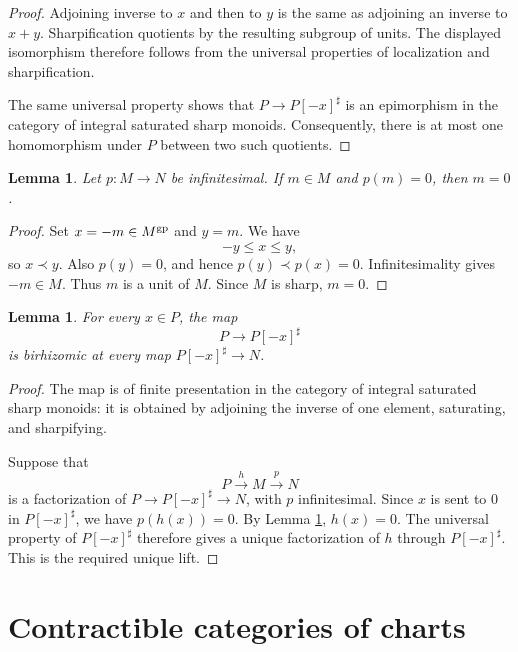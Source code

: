 \documentclass{article}
\newtheorem{lemma}[theorem]{Lemma}
\theoremstyle{definition}
\theoremstyle{remark}
\begin{document}
\begin{proof}
Adjoining inverse to \(x\) and then to \(y\) is the same as adjoining an inverse to \(x+y\).  Sharpification quotients by the resulting subgroup of units.  The displayed isomorphism therefore follows from the universal properties of localization and sharpification.

The same universal property shows that \(P\to P[-x]^\sharp\) is an epimorphism in the category of integral saturated sharp monoids.  Consequently, there is at most one homomorphism under \(P\) between two such quotients.
\end{proof}

\begin{lemma}\label{lem:zero-fibre}
Let \(p:M\to N\) be infinitesimal.  If \(m\in M\) and \(p(m)=0\), then \(m=0\).
\end{lemma}

\begin{proof}
Set \(x=-m\in M^{\rm gp}\) and \(y=m\).  We have
\[
-y\le x\le y,
\]
so \(x\prec y\).  Also \(p(y)=0\), and hence \(p(y)\prec p(x)=0\).  Infinitesimality gives \(-m\in M\).  Thus \(m\) is a unit of \(M\).  Since \(M\) is sharp, \(m=0\).
\end{proof}

\begin{lemma}\label{lem:face-maps-birhizomic}
For every \(x\in P\), the map
\[
P\longrightarrow P[-x]^\sharp
\]
is birhizomic at every map \(P[-x]^\sharp\to N\).
\end{lemma}

\begin{proof}
The map is of finite presentation in the category of integral saturated sharp monoids: it is obtained by adjoining the inverse of one element, saturating, and sharpifying.

Suppose that
\[
P\xrightarrow{h}M\xrightarrow{p}N
\]
is a factorization of \(P\to P[-x]^\sharp\to N\), with \(p\) infinitesimal.  Since \(x\) is sent to \(0\) in \(P[-x]^\sharp\), we have \(p(h(x))=0\).  By Lemma \ref{lem:zero-fibre}, \(h(x)=0\).  The universal property of \(P[-x]^\sharp\) therefore gives a unique factorization of \(h\) through \(P[-x]^\sharp\).  This is the required unique lift.
\end{proof}

\section{Contractible categories of charts}
\end{document}
